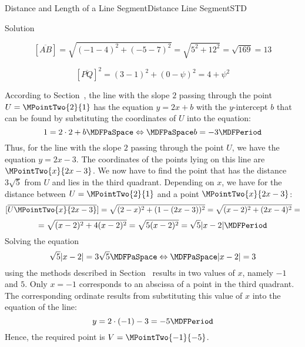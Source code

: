 \begin{MXContent}{Distance and Length of a Line Segment}{Distance Line Segment}{STD}
\begin{MExercise}
\begin{MHint}{Solution} 
\begin{MExerciseItems}
\item{\[
       [\overline{A B}] = \sqrt{(-1-4)^2+(-5-7)^2} = \sqrt{5^2+12^2} = \sqrt{169} = 13
      \]
} 
\item{\[
       [\overline{P Q}]^2 = (3-1)^2 + (0-\psi)^2 = 4+\psi^2
      \]
}
\item{According to Section~, the line with the slope $2$ passing through the point $U=\MPointTwo{2}{1}$ has the equation $y=2x+b$ with the $y$-intercept $b$ that can be found by substituting the coordinates of $U$ into the equation:
\[
 1 = 2\cdot 2 + b\MDFPaSpace\Leftrightarrow\MDFPaSpace b=-3\MDFPeriod
\]
Thus, for the line with the slope $2$ passing through the point $U$, we have the equation $y=2x-3$. The coordinates of the points lying on this line
are $\MPointTwo{x}{2x-3}$. We now have to find the point that has the distance $3\sqrt{5}$ from $U$ and lies in the third quadrant.
Depending on $x$, we have for the distance between $U=\MPointTwo{2}{1}$ and a point $\MPointTwo{x}{2x-3}$:
\[
 [\overline{U\MPointTwo{x}{2x-3}}] = \sqrt{(2-x)^2+(1-(2x-3))^2}=\sqrt{(x-2)^2 + (2x-4)^2} =
\]
\[
 = \sqrt{(x-2)^2 + 4(x-2)^2} = \sqrt{5(x-2)^2} = \sqrt{5}|x-2|\MDFPeriod
\]
Solving the equation
\[
 \sqrt{5}|x-2| = 3\sqrt{5}\MDFPaSpace\Leftrightarrow\MDFPaSpace |x-2|=3
\]
using the methods described in Section~ results in two values of $x$, namely $-1$ and $5$. Only $x=-1$ corresponds to an abscissa of a point in the third quadrant. The corresponding ordinate results from substituting this value of $x$
into the equation of the line:
\[
 y = 2\cdot(-1)-3 = -5\MDFPeriod
\]
Hence, the required point is $V=\MPointTwo{-1}{-5}$.
}
\end{MExerciseItems}

\end{MHint} 

\end{MExercise}



\end{MXContent}

